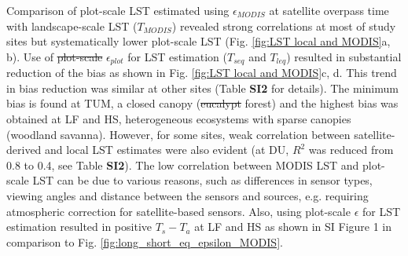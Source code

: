 \documentclass[fleqn,10pt]{wlscirep}
\providecommand{\DIFaddtex}[1]{{\protect\color{blue}\uwave{#1}}} %
\providecommand{\DIFdeltex}[1]{{\protect\color{red}\sout{#1}}}                      %
\providecommand{\DIFaddbegin}{} %
\providecommand{\DIFaddend}{} %
\providecommand{\DIFdelbegin}{} %
\providecommand{\DIFdelend}{} %
\providecommand{\DIFadd}[1]{\texorpdfstring{\DIFaddtex{#1}}{#1}} %
\providecommand{\DIFdel}[1]{\texorpdfstring{\DIFdeltex{#1}}{}} %
\begin{document}
Comparison of plot-scale LST estimated using $\epsilon_{MODIS}$ at satellite overpass time with landscape-scale LST ($T_{MODIS}$) revealed strong correlations at most of study sites but systematically lower plot-scale LST (Fig. \ref{fig:LST local and MODIS}a, b). Use  of \DIFdelbegin \DIFdel{plot-scale }\DIFdelend $\epsilon_{plot}$ for LST estimation ($T_{seq}$ and $T_{leq}$) resulted in substantial reduction of the bias as shown in Fig. \ref{fig:LST local and MODIS}c, d. This trend in bias reduction was similar at other sites (Table \textbf{SI2} for details). The  minimum bias is found  at TUM, a closed canopy (\DIFdelbegin \DIFdel{eucalypt }\DIFdelend \DIFaddbegin \DIFadd{eucalyptus }\DIFaddend forest) and the highest bias was obtained at LF and HS, heterogeneous ecosystems with sparse canopies (woodland savanna). However, for some sites, weak correlation between satellite-derived and local LST estimates were also evident (at DU, $R^2$ was reduced from 0.8 to 0.4, see Table \textbf{SI2}). The low correlation between MODIS LST and plot-scale LST can be due to various reasons, such as differences in sensor types, viewing angles and distance between the sensors and sources, e.g. requiring atmospheric correction for satellite-based sensors. Also, using plot-scale $\epsilon$ for LST estimation resulted in positive $T_{s} - T_{a}$ at LF and HS as shown in SI Figure 1 in comparison to Fig. \ref{fig:long_short_eq_epsilon_MODIS}.  
\end{document}
